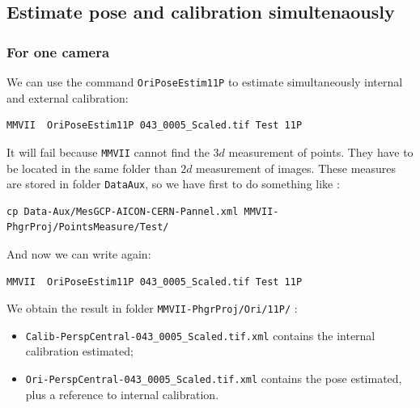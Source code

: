 
\subsection{Estimate pose and calibration simultenaously}


\subsubsection{For one camera}

We can use the command {\tt OriPoseEstim11P} to estimate simultaneously internal and external
calibration:

\begin{lstlisting}
MMVII  OriPoseEstim11P 043_0005_Scaled.tif Test 11P
\end{lstlisting}

It will fail because {\tt MMVII} cannot find the $3d$ measurement of points. They 
have to be located in the same folder than $2d$ measurement of images.
These measures are stored in folder {\tt DataAux}, so we have first to do
something like :

\begin{lstlisting}
cp Data-Aux/MesGCP-AICON-CERN-Pannel.xml MMVII-PhgrProj/PointsMeasure/Test/
\end{lstlisting}

And now we can write again:

\begin{lstlisting}
MMVII  OriPoseEstim11P 043_0005_Scaled.tif Test 11P
\end{lstlisting}

We obtain the result in folder {\tt MMVII-PhgrProj/Ori/11P/} :

\begin{itemize}
	\item {\tt Calib-PerspCentral-043\_0005\_Scaled.tif.xml} contains the internal calibration estimated;
	\item {\tt Ori-PerspCentral-043\_0005\_Scaled.tif.xml} contains the pose estimated, plus a reference to internal calibration.
\end{itemize}

\label{Resec1PPPerIm}


